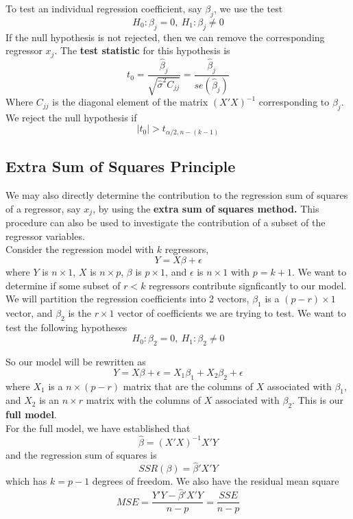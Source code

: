 To test an individual regression coefficient, say $\beta_j$, we use the test 
\[H_0: \beta_j = 0, \ H_1: \beta_j \neq 0\]
If the null hypothesis is not rejected, then we can remove the corresponding regressor $x_j$. The \textbf{test statistic} for this hypothesis is 
\[t_0 = \frac{\hat{\beta}_j}{\sqrt{\hat{\sigma}^2C_{jj}}} = \frac{\hat{\beta}_j}{se(\hat{\beta}_j)}\]
Where $C_{jj}$ is the diagonal element of the matrix $(X'X)^{-1}$ corresponding to $\beta_j$. We reject the null hypothesis if
\[|t_0| > t_{\alpha/2, n-(k-1)}\]
\subsection{Extra Sum of Squares Principle}

We may also directly determine the contribution to the regression sum of squares of a regressor, say $x_j$, by using the \textbf{extra sum of squares method.} This procedure can also be used to investigate the contribution of a subset of the regressor variables. \\

Consider the regression model with $k$ regressors, 
\[Y = X\beta + \epsilon\]
where $Y$ is $n\times 1$, $X$ is $n\times p$, $\beta$ is $p\times 1$, and $\epsilon$ is $n \times 1$ with $p = k+1$. We want to determine if some subset of $r < k$ regressors contribute signficantly to our model. We will partition the regression coefficients into 2 vectors, $\beta_1$ is a $(p-r) \times 1$ vector, and $\beta_2$ is the $r \times 1$ vector of coefficients we are trying to test. We want to test the following hypotheses
\[H_0: \beta_2 = 0, \ H_1: \beta_2 \neq 0\]

So our model will be rewritten as
\[Y = X\beta + \epsilon = X_1\beta_1 + X_2\beta_2 + \epsilon\]
where $X_1$ is a $n \times (p-r)$ matrix that are the columns of $X$ associated with $\beta_1$, and $X_2$ is an $n \times r$ matrix with the columns of $X$ associated with $\beta_2$. This is our \textbf{full model}.\\

For the full model, we have established that 
\[\hat{\beta} = (X'X)^{-1}X'Y\]
and the regression sum of squares is 
\[SSR(\beta) = \hat{\beta}'X'Y\]
which has $k = p-1$ degrees of freedom. We also have the residual mean square 
\[MSE = \frac{Y'Y - \hat{\beta}'X'Y}{n-p} = \frac{SSE}{n-p}\]

